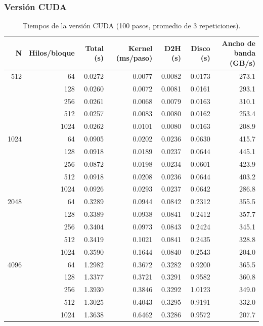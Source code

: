 \subsubsection*{Versión CUDA}

\begin{table}[H]
  \centering
  \begin{tabular}{rrrrrrr}
    \toprule
    N & Hilos/bloque & Total (s) & Kernel (ms/paso) & D2H (s) & Disco (s) & Ancho de banda (GB/s) \\
    \midrule
    512  & 64   & 0.0272 & 0.0077 & 0.0082 & 0.0173 & 273.1 \\
         & 128  & 0.0260 & 0.0072 & 0.0081 & 0.0161 & 293.1 \\
         & 256  & 0.0261 & 0.0068 & 0.0079 & 0.0163 & 310.1 \\
         & 512  & 0.0257 & 0.0083 & 0.0080 & 0.0162 & 253.4 \\
         & 1024 & 0.0262 & 0.0101 & 0.0080 & 0.0163 & 208.9 \\
    \midrule
    1024 & 64   & 0.0905 & 0.0202 & 0.0236 & 0.0630 & 415.7 \\
         & 128  & 0.0918 & 0.0189 & 0.0237 & 0.0644 & 445.1 \\
         & 256  & 0.0872 & 0.0198 & 0.0234 & 0.0601 & 423.9 \\
         & 512  & 0.0918 & 0.0208 & 0.0236 & 0.0644 & 403.2 \\
         & 1024 & 0.0926 & 0.0293 & 0.0237 & 0.0642 & 286.8 \\
    \midrule
    2048 & 64   & 0.3289 & 0.0944 & 0.0842 & 0.2312 & 355.5 \\
         & 128  & 0.3389 & 0.0938 & 0.0841 & 0.2412 & 357.7 \\
         & 256  & 0.3404 & 0.0973 & 0.0843 & 0.2424 & 345.1 \\
         & 512  & 0.3419 & 0.1021 & 0.0841 & 0.2435 & 328.8 \\
         & 1024 & 0.3590 & 0.1644 & 0.0840 & 0.2543 & 204.0 \\
    \midrule
    4096 & 64   & 1.2982 & 0.3672 & 0.3282 & 0.9200 & 365.5 \\
         & 128  & 1.3377 & 0.3721 & 0.3291 & 0.9582 & 360.8 \\
         & 256  & 1.3930 & 0.3846 & 0.3292 & 1.0123 & 349.0 \\
         & 512  & 1.3025 & 0.4043 & 0.3295 & 0.9191 & 332.0 \\
         & 1024 & 1.3638 & 0.6462 & 0.3286 & 0.9572 & 207.7 \\
    \bottomrule
  \end{tabular}
  \caption{Tiempos de la versión CUDA (100 pasos, promedio de 3 repeticiones).}
  \label{tab:paralelo}
\end{table}

